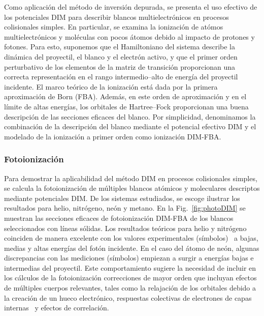 Como aplicación del método de inversión depurada, se presenta el uso 
efectivo de los potenciales DIM para describir blancos multielectrónicos 
en procesos colisionales simples. En particular, se examina la 
ionización de atómos multielectrónicos y moléculas con pocos átomos 
debido al impacto de protones y fotones. 
Para esto, suponemos que el Hamiltoniano del sistema describe la 
dinámica del proyectil, el blanco y el electrón activo, y que el primer 
orden perturbativo de los elementos de la matriz de transición 
proporcionan una correcta representación en el rango intermedio--alto
de energía del proyectil incidente. El marco teórico de la ionización
está dada por la primera aproximación de Born (FBA). Además, en este 
orden de aproximación  y en el límite de altas energías, los orbitales 
de Hartree--Fock proporcionan una buena descripción de las secciones 
eficaces del blanco.
Por simplicidad, denominamos la combinación de la descripción del blanco 
mediante el potencial efectivo DIM y el modelado de la ionización a 
primer orden como ionización DIM-FBA. 

\subsubsection{Fotoionización}

Para demostrar la aplicabilidad del método DIM en procesos colisionales 
simples, se calcula la fotoionización de múltiples blancos atómicos y 
moleculares descriptos mediante potenciales DIM. De los sistemas 
estudiados, se escoge ilustrar los resultados para helio, nitrógeno, 
neón y metano. En la Fig.~\ref{fig:photoDIM} se muestran las secciones
eficaces de fotoionización DIM-FBA de los blancos seleccionados con 
líneas sólidas. Los resultados teóricos para helio y nitrógeno coinciden 
de manera excelente con los valores experimentales 
(símbolos)~\cite{Samson:90,Henke:93,Stolte:16} a bajas, medias y altas 
energías del fotón incidente. En el caso del átomo de neón, algunas 
discrepancias con las mediciones (símbolos) \cite{Henke:93,Samson:02} 
empiezan a surgir a energías bajas e intermedias del proyectil. Este 
comportamiento sugiere la necesidad de incluir en los cálculos de la 
fotoionización correcciones de mayor orden que incluyan efectos de 
múltiples cuerpos relevantes, tales como la relajación de los orbitales 
debido a la creación de un hueco electrónico, respuestas colectivas de 
electrones de capas internas~\cite{Ederer:64} y efectos de correlación.

